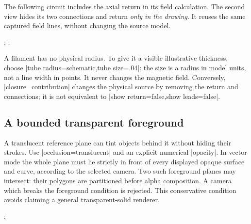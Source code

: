 The following circuit includes the axial return in its field calculation.
The second view hides its two connections and return \emph{only in the drawing}.
It reuses the same captured field lines, without changing the source model.
\begin{codeexample}[width=0pt]
\begingroup
\tikzpicture[femm/biot,
 femm/biot view={geometry samples=16,
 seeds={0/.3/0;0/-.3/0},step=.15,maximum length=6}]
 \femmbiotsource[kind=solenoid,winding=helix,closure=axis,
  current=2,radius=.8,length=2,turns=2,wire radius=.06]
 \femmbiotscene[name=solid-coil]
\endtikzpicture
\tikzpicture[femm/view 3d={scene=solid-coil,
 visibility=vector,conductors=tube,tube sides=6,
 coordinate scale=.9,xmin=-1.5,xmax=1.5,
 ymin=-1.5,ymax=1.5,zmin=-2,zmax=2}]
 ;
\endtikzpicture
\quad
\tikzpicture[femm/view 3d={scene=solid-coil,
 visibility=vector,conductors=tube,tube sides=6,
 show return=false,show leads=false,tube color=blue!65,
 coordinate scale=.9,xmin=-1.5,xmax=1.5,
 ymin=-1.5,ymax=1.5,zmin=-2,zmax=2}]
 ;
\endtikzpicture
{}
\endgroup
\end{codeexample}

A filament has no physical radius. To give it a visible illustrative thickness,
choose |tube radius=schematic,tube size=.04|: the size is a radius in model
units, not a line width in points. It never changes the magnetic field. Conversely,
|closure=contribution| changes the physical source by removing the return and
connections; it is not equivalent to |show return=false,show leads=false|.

\subsection{A bounded transparent foreground}
A translucent reference plane can tint objects behind it without hiding their
strokes. Use |occlusion=translucent| and an explicit numerical |opacity|.
In vector mode the whole plane must lie strictly in front of every displayed
opaque surface and curve, according to the selected camera. Two such foreground
planes may intersect: their polygons are partitioned before alpha composition.
A camera which breaks the foreground condition is rejected. This conservative
condition avoids claiming a general transparent-solid renderer.
\begin{codeexample}[width=0pt]
\begingroup
\tikzpicture[femm/biot,
 femm/biot view={geometry samples=16}]
 \femmbiotsource[kind=loop,current=1,radius=.8]
 \femmbiotscene[name=tinted-loop,field=false]
\endtikzpicture
\femmviewplane[scene=tinted-loop,plane=xy,origin=0/0/.5,
 umin=-1,umax=1,vmin=-1,vmax=1,
 occlusion=translucent,opacity=.22,style={fill=blue!50}]
\tikzpicture[femm/view 3d={scene=tinted-loop,
 visibility=vector,conductors=tube,tube radius=schematic,
 tube size=.05,tube sides=8,azimuth=0,elevation=90,
 axes=none,xmin=-1.2,xmax=1.2,ymin=-1.2,ymax=1.2,
 zmin=-1,zmax=1,coordinate scale=1.5}]
 ;
\endtikzpicture
{}
\endgroup
\end{codeexample}

